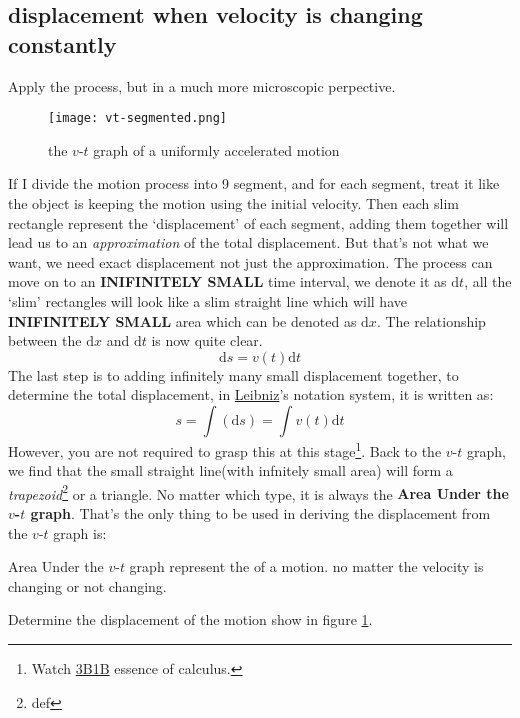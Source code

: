 \documentclass[a4paper]{tufte-handout}
\newenvironment{TaskBox} %
{\begin{tcolorbox}[breakable,colback=b1!30,colframe=b1,title=Task]} {\end{tcolorbox}}
\newenvironment{SummBox}
{\begin{tcolorbox}[breakable,colback=r1!30,colframe=r1,title=Summary]} {\end{tcolorbox}}
\def\d{{\mathrm{d}}}
\begin{document}
\subsection{displacement when velocity is changing constantly}
Apply the process, but in a much more microscopic perpective. 
\begin{figure}[h]
\texttt{[image: vt-segmented.png]}
\caption{the $v$-$t$ graph of a uniformly accelerated motion}
\label{fig:uam vt}
\end{figure}
If I divide the motion process into 9 segment, and for each segment, treat it like the object is keeping the motion using the initial velocity. Then each slim rectangle represent the `displacement' of  each segment, adding them together will lead us to an \emph{approximation} of the total displacement. But that's not what we want, we need exact displacement not just the approximation. The process can move on to an \textbf{INIFINITELY SMALL} time interval, we denote it as $\d t$, all the `slim' rectangles will look like a slim straight line which will have \textbf{INIFINITELY SMALL} area which can be denoted as $\d x$. The relationship between the $\d x$ and $\d t$ is now quite clear.
\begin{equation*}
  \d s = v(t) \d t
\end{equation*}
The last step is to adding infinitely many small displacement together, to determine the total displacement, in \href{https://faculty.atu.edu/mfinan/2243/business23.pdf}{Leibniz}'s notation system, it is written as:
\begin{equation*}
  s =\int (\d s)  =  \int v(t) \d t
\end{equation*}
However, you are not required to grasp this at this stage\footnote{Watch \href{https://www.bilibili.com/video/BV1cx411m78R}{3B1B} essence of calculus.}. Back to the $v$-$t$ graph, we find that the small straight line(with infnitely small area) will form a \emph{trapezoid}\footnote{def} or a triangle. No matter which type, it is always the \textbf{Area Under the $v$-$t$ graph}. That's the only thing to be used in deriving the displacement from the $v$-$t$ graph is:
\begin{SummBox}
  Area Under the $v$-$t$ graph represent the \uline{\hspace{0.5 in}} of a motion. no matter the velocity is changing or not changing.
\end{SummBox} 

\begin{TaskBox}
Determine the displacement of the motion show in figure \ref{fig:uam vt}. 
\vspace{0.2 in}
\end{TaskBox}
\end{document}

